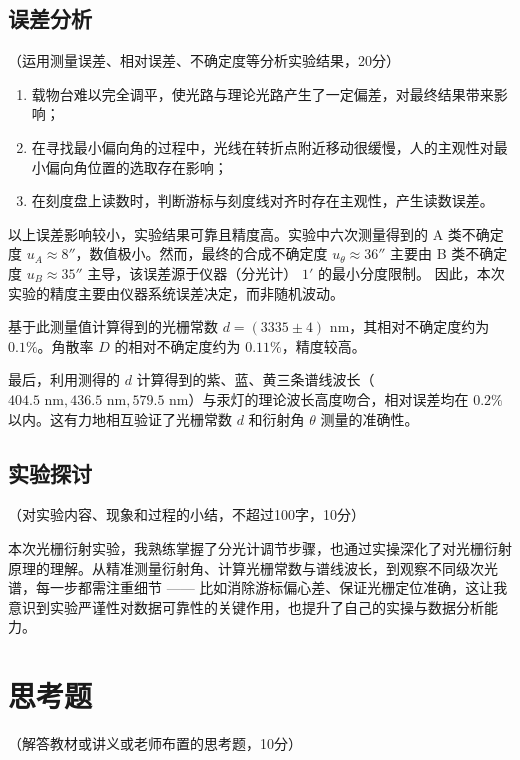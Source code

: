 \documentclass[10pt,a4paper]{ctexart}
\newcommand{\myspace}[1]{\par\vspace{#1\baselineskip}} %
\newcommand{\xiaosi}{\fontsize{12pt}{16pt}\selectfont}
\begin{document}
    \subsection{误差分析}
    \xiaosi （运用测量误差、相对误差、不确定度等分析实验结果，20分）
    
    \begin{enumerate}
        \item 载物台难以完全调平，使光路与理论光路产生了一定偏差，对最终结果带来影响；
        \item 在寻找最小偏向角的过程中，光线在转折点附近移动很缓慢，人的主观性对最小偏向角位置的选取存在影响；
        \item 在刻度盘上读数时，判断游标与刻度线对齐时存在主观性，产生读数误差。
    \end{enumerate}

    以上误差影响较小，实验结果可靠且精度高。实验中六次测量得到的 A 类不确定度 $u_A \approx 8''$，数值极小。然而，最终的合成不确定度 $u_\theta \approx 36''$ 主要由 B 类不确定度 $u_B \approx 35''$ 主导，该误差源于仪器（分光计） $1'$ 的最小分度限制。
    因此，本次实验的精度主要由仪器系统误差决定，而非随机波动。
    
    基于此测量值计算得到的光栅常数 $d = (3335 \pm 4) \text{ nm}$，其相对不确定度约为 $0.1\%$。角散率 $D$ 的相对不确定度约为 $0.11\%$，精度较高。
    
    最后，利用测得的 $d$ 计算得到的紫、蓝、黄三条谱线波长（$404.5 \text{ nm}, 436.5 \text{ nm}, 579.5 \text{ nm}$）与汞灯的理论波长高度吻合，相对误差均在 $0.2\%$ 以内。这有力地相互验证了光栅常数 $d$ 和衍射角 $\theta$ 测量的准确性。
    
    
    \subsection{实验探讨}
    \xiaosi （对实验内容、现象和过程的小结，不超过100字，10分）

    \myspace{1}

    本次光栅衍射实验，我熟练掌握了分光计调节步骤，也通过实操深化了对光栅衍射原理的理解。从精准测量衍射角、计算光栅常数与谱线波长，到观察不同级次光谱，每一步都需注重细节 —— 比如消除游标偏心差、保证光栅定位准确，这让我意识到实验严谨性对数据可靠性的关键作用，也提升了自己的实操与数据分析能力。        
    \section{思考题}

    \xiaosi （解答教材或讲义或老师布置的思考题，10分）
\end{document}
